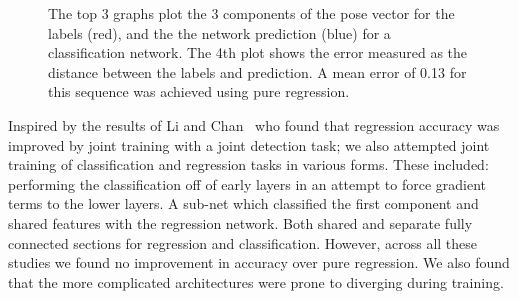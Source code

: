 \documentclass[11pt]{article} %
\begin{document}
\begin{figure}
\centering
{}%
\qquad
{}%
\caption{The top 3 graphs plot the 3 components of the pose vector for the labels (red), and the the network prediction (blue) for a classification network. The 4th plot shows the error measured as the distance between the labels and prediction. A mean error of 0.13 for this sequence was achieved using pure regression.  }
\label{fig:classesRes}
\end{figure}

Inspired by the results of Li and Chan~\cite{Li2014} who found that regression accuracy was improved by joint training with a joint detection task; we also attempted joint training of classification and regression tasks in various forms. These included: performing the classification off of early layers in an attempt to force gradient terms to the lower layers. A sub-net which classified the first component and shared features with the regression network. Both shared and separate fully connected sections for regression and classification. However, across all these studies we found no improvement in accuracy over pure regression. We also found that the more complicated architectures were prone to diverging during training. 
\end{document}
